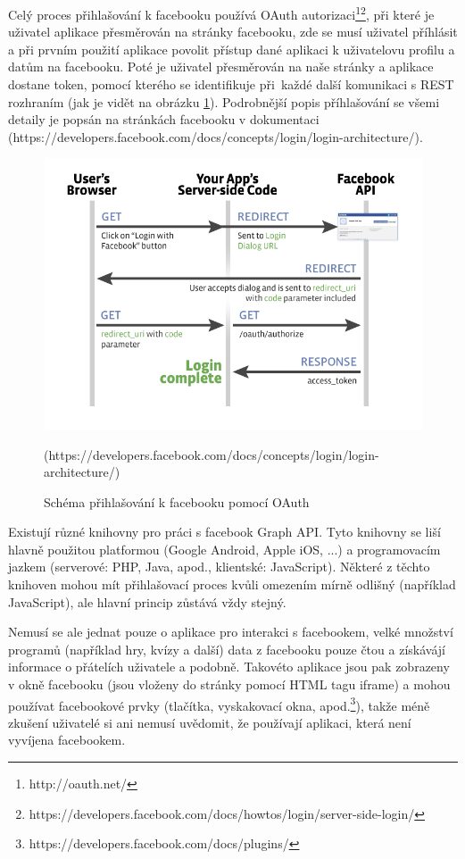\documentclass[thesis=M,czech]{FITthesis}[2013/05/10]
\begin{document}
Celý proces přihlašování k facebooku používá OAuth autorizaci\footnote{http://oauth.net/}\footnote{https://developers.facebook.com/docs/howtos/login/server-side-login/}, při které je uživatel aplikace přesměrován na stránky facebooku, zde se musí uživatel příhlásit a při prvním použití aplikace povolit přístup dané aplikaci k uživatelovu profilu a datům na facebooku. Poté je uživatel přesměrován na naše stránky a aplikace dostane token, pomocí kterého se identifikuje při~každé další komunikaci s REST rozhraním  (jak je vidět na obrázku \ref{fig:oAuthDiagram}). Podrobnější popis příhlašování se všemi detaily je popsán na stránkách facebooku v dokumentaci \newline(https://developers.facebook.com/docs/concepts/login/login-architecture/). 

\begin{figure}[h]
\begin{center}
\includegraphics[width=5in]{figures/server-side-diagram.png}
\caption{Schéma přihlašování k facebooku pomocí OAuth}
(https://developers.facebook.com/docs/concepts/login/login-architecture/)
\label{fig:oAuthDiagram}
\end{center}
\end{figure}

Existují různé knihovny pro práci s facebook Graph API. Tyto knihovny se liší hlavně použitou platformou (Google Android, Apple iOS, ...) a programovacím jazkem (serverové: PHP, Java, apod., klientské: JavaScript). Některé z těchto knihoven mohou mít přihlašovací proces kvůli omezením mírně odlišný (například JavaScript), ale hlavní princip zůstává vždy stejný.

Nemusí se ale jednat pouze o aplikace pro interakci s facebookem, velké množství programů (například hry, kvízy a další) data z facebooku pouze čtou a získávájí informace o přátelích uživatele a podobně. Takovéto aplikace jsou pak zobrazeny v okně facebooku (jsou vloženy do stránky pomocí HTML tagu iframe) a mohou používat facebookové prvky (tlačítka, vyskakovací okna, apod.\footnote{https://developers.facebook.com/docs/plugins/}), takže méně zkušení uživatelé si ani nemusí uvědomit, že používají aplikaci, která není vyvíjena facebookem. 
\end{document}
